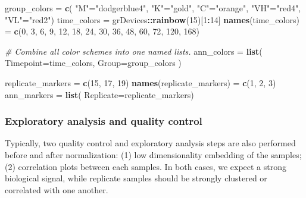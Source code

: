 \documentclass[9pt,a4paper,]{extarticle}
\newenvironment{Shaded}{\begin{snugshade}}{\end{snugshade}}
\newcommand{\CommentTok}[1]{\textcolor[rgb]{0.56,0.35,0.01}{\textit{#1}}}
\newcommand{\DataTypeTok}[1]{\textcolor[rgb]{0.13,0.29,0.53}{#1}}
\newcommand{\DecValTok}[1]{\textcolor[rgb]{0.00,0.00,0.81}{#1}}
\newcommand{\KeywordTok}[1]{\textcolor[rgb]{0.13,0.29,0.53}{\textbf{#1}}}
\newcommand{\NormalTok}[1]{#1}
\newcommand{\OperatorTok}[1]{\textcolor[rgb]{0.81,0.36,0.00}{\textbf{#1}}}
\newcommand{\StringTok}[1]{\textcolor[rgb]{0.31,0.60,0.02}{#1}}
\begin{document}
\begin{Shaded}
\begin{Highlighting}[]
\NormalTok{group_colors =}\StringTok{ }\KeywordTok{c}\NormalTok{(}
    \StringTok{"M"}\NormalTok{=}\StringTok{"dodgerblue4"}\NormalTok{,}
    \StringTok{"K"}\NormalTok{=}\StringTok{"gold"}\NormalTok{,}
    \StringTok{"C"}\NormalTok{=}\StringTok{"orange"}\NormalTok{,}
    \StringTok{"VH"}\NormalTok{=}\StringTok{"red4"}\NormalTok{,}
    \StringTok{"VL"}\NormalTok{=}\StringTok{"red2"}\NormalTok{)}
\NormalTok{time_colors =}\StringTok{ }\NormalTok{grDevices}\OperatorTok{::}\KeywordTok{rainbow}\NormalTok{(}\DecValTok{15}\NormalTok{)[}\DecValTok{1}\OperatorTok{:}\DecValTok{14}\NormalTok{]}
\KeywordTok{names}\NormalTok{(time_colors) =}\StringTok{ }\KeywordTok{c}\NormalTok{(}\DecValTok{0}\NormalTok{, }\DecValTok{3}\NormalTok{, }\DecValTok{6}\NormalTok{, }\DecValTok{9}\NormalTok{, }\DecValTok{12}\NormalTok{, }\DecValTok{18}\NormalTok{, }\DecValTok{24}\NormalTok{, }\DecValTok{30}\NormalTok{, }\DecValTok{36}\NormalTok{, }\DecValTok{48}\NormalTok{, }\DecValTok{60}\NormalTok{, }\DecValTok{72}\NormalTok{, }\DecValTok{120}\NormalTok{, }\DecValTok{168}\NormalTok{)}

\CommentTok{# Combine all color schemes into one named lists.}
\NormalTok{ann_colors =}\StringTok{ }\KeywordTok{list}\NormalTok{(}
    \DataTypeTok{Timepoint=}\NormalTok{time_colors,}
    \DataTypeTok{Group=}\NormalTok{group_colors}
\NormalTok{    )}

\NormalTok{replicate_markers =}\StringTok{ }\KeywordTok{c}\NormalTok{(}\DecValTok{15}\NormalTok{, }\DecValTok{17}\NormalTok{, }\DecValTok{19}\NormalTok{)}
\KeywordTok{names}\NormalTok{(replicate_markers) =}\StringTok{ }\KeywordTok{c}\NormalTok{(}\DecValTok{1}\NormalTok{, }\DecValTok{2}\NormalTok{, }\DecValTok{3}\NormalTok{)}
\NormalTok{ann_markers =}\StringTok{ }\KeywordTok{list}\NormalTok{(}
    \DataTypeTok{Replicate=}\NormalTok{replicate_markers)}
\end{Highlighting}
\end{Shaded}

\hypertarget{exploratory-analysis-and-quality-control}{%
\subsubsection{Exploratory analysis and quality control}\label{exploratory-analysis-and-quality-control}}

Typically, two quality control and exploratory analysis steps are also
performed before and after normalization: (1) low dimensionality embedding of
the samples; (2) correlation plots between each samples. In both cases, we
expect a strong biological signal, while replicate samples should be strongly
clustered or correlated with one another.
\end{document}
